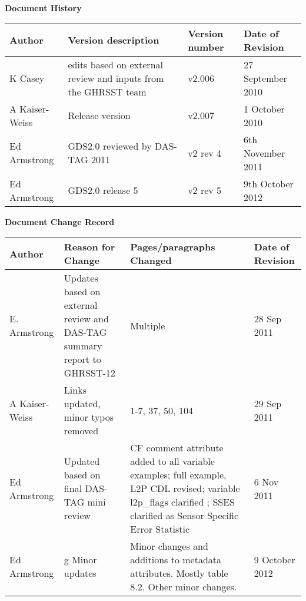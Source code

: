 \newpage
\textbf{\large Document History} \par \vspace{1.5cm}
\begin{tabular}{|p{2.5cm}|>{\raggedright}p{5.5cm}|p{3cm}|p{2cm}|}
\hline \rowcolor{lightgray}
Author & Version description & Version number & Date of Revision\\
\hline
K Casey & edits based on external review and inputs from the GHRSST team & v2.006 & 27 September 2010 \\
\hline
A Kaiser-Weiss & Release version & v2.007 & 1 October 2010 \\
\hline
Ed Armstrong & GDS2.0 reviewed by DAS-TAG 2011 & v2 rev 4 & 6th November 2011 \\
\hline
Ed Armstrong & GDS2.0 release 5 & v2 rev 5 & 9th October 2012 \\
\hline
\end{tabular}
\par \vspace{3cm}
\textbf{\Large Document Change Record} \par \vspace{1.5cm}
\begin{tabular}{|p{2.5cm}|>{\raggedright}p{5.5cm}|p{3.5cm}|p{2cm}|}
\hline \rowcolor{lightgray}
Author & Reason for Change & Pages/paragraphs Changed & Date of Revision\\
\hline
E. Armstrong & Updates based on external review and DAS-TAG summary report to GHRSST-12 & Multiple & 28 Sep 2011 \\
\hline
A Kaiser-Weiss & Links updated, minor typos removed & 1-7, 37, 50, 104 & 29 Sep 2011 \\
\hline
Ed Armstrong & Updated based on final DAS-TAG mini review & CF comment attribute added to all variable examples; full example, L2P CDL revised; variable l2p\_flags clarified ; SSES clarified as Sensor Specific Error Statistic & 6 Nov 2011 \\
\hline
Ed Armstrong & g Minor updates & Minor changes and additions to metadata attributes. Mostly table 8.2. Other minor changes. & 9 October 2012 \\
\hline
\end{tabular}